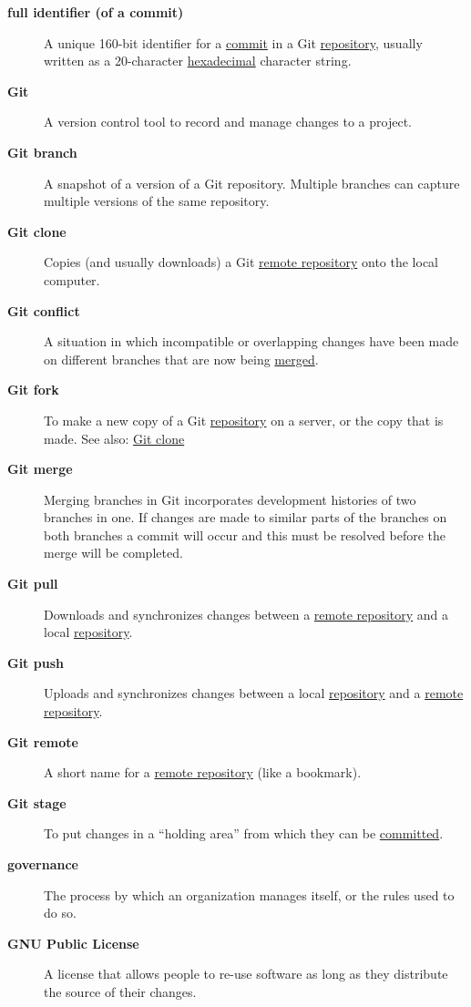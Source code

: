 \documentclass[
]{krantz}
\begin{document}
\begin{description}
\item[\textbf{full identifier (of a commit)}]
A unique 160-bit identifier for a \protect\hyperlink{commit}{commit} in a Git \protect\hyperlink{repository}{repository}, usually written as a 20-character \protect\hyperlink{hexadecimal}{hexadecimal} character string.
\item[\textbf{Git}]
A version control tool to record and manage changes to a project.
\item[\textbf{Git branch}]
A snapshot of a version of a Git repository. Multiple branches can capture multiple versions of the same repository.
\item[\textbf{Git clone}]
Copies (and usually downloads) a Git \protect\hyperlink{remote_repository}{remote repository} onto the local computer.
\item[\textbf{Git conflict}]
A situation in which incompatible or overlapping changes have been made on different branches that are now being \protect\hyperlink{git_merge}{merged}.
\item[\textbf{Git fork}]
To make a new copy of a Git \protect\hyperlink{repository}{repository} on a server, or the copy that is made. See also: \protect\hyperlink{git_clone}{Git clone}
\item[\textbf{Git merge}]
Merging branches in Git incorporates development histories of two branches in one. If changes are made to similar parts of the branches on both branches a commit will occur and this must be resolved before the merge will be completed.
\item[\textbf{Git pull}]
Downloads and synchronizes changes between a \protect\hyperlink{remote_repository}{remote repository} and a local \protect\hyperlink{repository}{repository}.
\item[\textbf{Git push}]
Uploads and synchronizes changes between a local \protect\hyperlink{repository}{repository} and a \protect\hyperlink{remote_repository}{remote repository}.
\item[\textbf{Git remote}]
A short name for a \protect\hyperlink{remote_repository}{remote repository} (like a bookmark).
\item[\textbf{Git stage}]
To put changes in a ``holding area'' from which they can be \protect\hyperlink{commit}{committed}.
\item[\textbf{governance}]
The process by which an organization manages itself, or the rules used to do so.
\item[\textbf{GNU Public License}]
A license that allows people to re-use software as long as they distribute the source of their changes.

\end{description}
\end{document}
